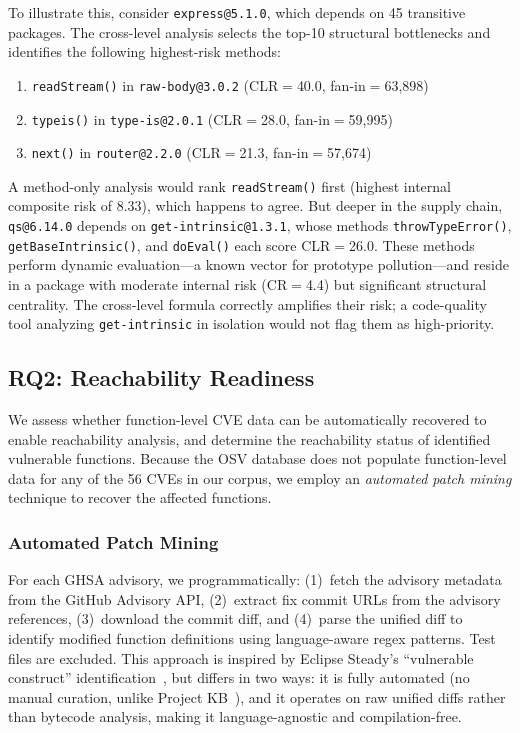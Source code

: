 \documentclass[conference]{IEEEtran}
\begin{document}
To illustrate this, consider \texttt{express@5.1.0}, which depends on 45 transitive packages. The cross-level analysis selects the top-10 structural bottlenecks and identifies the following highest-risk methods:

\begin{enumerate}
    \item \texttt{readStream()} in \texttt{raw-body@3.0.2} (CLR$=$40.0, fan-in$=$63{,}898)
    \item \texttt{typeis()} in \texttt{type-is@2.0.1} (CLR$=$28.0, fan-in$=$59{,}995)
    \item \texttt{next()} in \texttt{router@2.2.0} (CLR$=$21.3, fan-in$=$57{,}674)
\end{enumerate}

A method-only analysis would rank \texttt{readStream()} first (highest internal composite risk of 8.33), which happens to agree. But deeper in the supply chain, \texttt{qs@6.14.0} depends on \texttt{get-intrinsic@1.3.1}, whose methods \texttt{throwTypeError()}, \texttt{getBaseIntrinsic()}, and \texttt{doEval()} each score CLR$=$26.0. These methods perform dynamic evaluation---a known vector for prototype pollution---and reside in a package with moderate internal risk (CR$=$4.4) but significant structural centrality. The cross-level formula correctly amplifies their risk; a code-quality tool analyzing \texttt{get-intrinsic} in isolation would not flag them as high-priority.

\subsection{RQ2: Reachability Readiness}
\label{subsec:rq2}

We assess whether function-level CVE data can be automatically recovered to enable reachability analysis, and determine the reachability status of identified vulnerable functions. Because the OSV database does not populate function-level data for any of the 56 CVEs in our corpus, we employ an \emph{automated patch mining} technique to recover the affected functions.

\subsubsection{Automated Patch Mining}

For each GHSA advisory, we programmatically: (1)~fetch the advisory metadata from the GitHub Advisory API, (2)~extract fix commit URLs from the advisory references, (3)~download the commit diff, and (4)~parse the unified diff to identify modified function definitions using language-aware regex patterns. Test files are excluded. This approach is inspired by Eclipse Steady's ``vulnerable construct'' identification~\cite{ponta2018beyond}, but differs in two ways: it is fully automated (no manual curation, unlike Project KB~\cite{ponta2019projectkb}), and it operates on raw unified diffs rather than bytecode analysis, making it language-agnostic and compilation-free.
\end{document}
